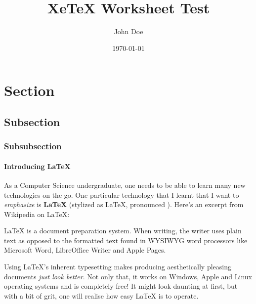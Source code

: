 \documentclass[a4paper]{qgabe-worksheet}
\author{John Doe} %
\title{XeTeX Worksheet Test} %
\date{\today{}} %
\begin{document}
%
%


%
%
\section{Section}
\subsection{Subsection}
\subsubsection{Subsubsection}
\paragraph{Introducing \LaTeX{}} %
\flushleft
As a Computer Science undergraduate, one needs to be able to learn many new technologies on the go. One particular technology that I learnt that I want to \emph{emphasize} is \textbf{LaTeX} (stylized as \LaTeX{}, pronounced ). Here's an excerpt from Wikipedia on LaTeX:

\begin{displayquote}
LaTeX is a document preparation system. When writing, the writer uses plain text as opposed to the formatted text found in WYSIWYG word processors like Microsoft Word, LibreOffice Writer and Apple Pages. 
\end{displayquote}
Using LaTeX's inherent typesetting makes producing aesthetically pleasing documents \emph{just look better}. Not only that, it works on Windows, Apple and Linux operating systems and is completely free! It might look daunting at first, but with a bit of grit, one will realise how easy LaTeX is to operate.
\end{document}
